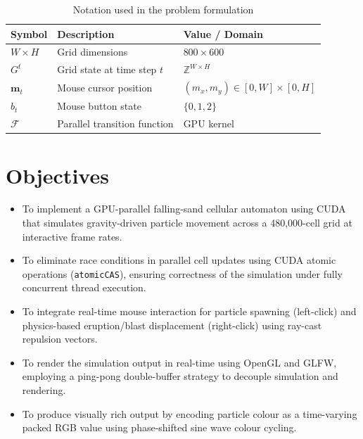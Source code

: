 \documentclass[12pt,a4paper]{article}
\begin{document}
    \begin{table}[h]
    \centering
    \begin{tabular}{|l|l|l|}
    \hline
    \textbf{Symbol} & \textbf{Description} & \textbf{Value / Domain} \\
    \hline
    $W \times H$ & Grid dimensions & $800 \times 600$ \\
    $G^t$ & Grid state at time step $t$ & $\mathbb{Z}^{W \times H}$ \\
    $\mathbf{m}_t$ & Mouse cursor position & $(m_x, m_y) \in [0,W]\times[0,H]$ \\
    $b_t$ & Mouse button state & $\{0,1,2\}$ \\
    $\mathcal{F}$ & Parallel transition function & GPU kernel \\
    \hline
    \end{tabular}
    \caption{Notation used in the problem formulation}
    \label{Table:notation}
    \end{table}

	\section{Objectives}
	\begin{itemize}
        \item To implement a GPU-parallel falling-sand cellular automaton using CUDA that simulates 
        gravity-driven particle movement across a 480,000-cell grid at interactive frame rates.
        \item To eliminate race conditions in parallel cell updates using CUDA atomic operations 
        (\texttt{atomicCAS}), ensuring correctness of the simulation under fully concurrent thread execution.
        \item To integrate real-time mouse interaction for particle spawning (left-click) and 
        physics-based eruption/blast displacement (right-click) using ray-cast repulsion vectors.
        \item To render the simulation output in real-time using OpenGL and GLFW, employing a 
        ping-pong double-buffer strategy to decouple simulation and rendering.
        \item To produce visually rich output by encoding particle colour as a time-varying packed 
        RGB value using phase-shifted sine wave colour cycling.
	\end{itemize}
\end{document}
